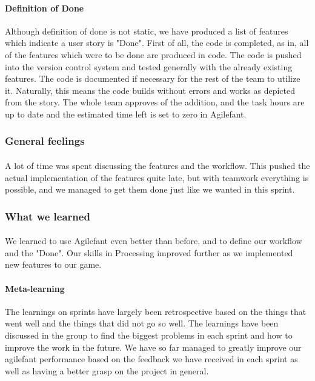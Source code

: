 \paragraph{Definition of Done} Although definition of done is not static, we have produced a list of features which indicate a user story is "Done". First of all, the code is completed, as in, all of the features which were to be done are produced in code. The code is pushed into the version control system and tested generally with the already existing features. The code is documented if necessary for the rest of the team to utilize it. Naturally, this means the code builds without errors and works as depicted from the story. The whole team approves of the addition, and the task hours are up to date and the estimated time left is set to zero in Agilefant.


\subsubsection{General feelings}

\paragraph{} A lot of time was spent discussing the features and the workflow. This pushed the actual implementation of the features quite late, but with teamwork everything is possible, and we managed to get them done just like we wanted in this sprint.

\subsubsection{What we learned}

\paragraph{} We learned to use Agilefant even better than before, and to define our workflow and the "Done". Our skills in Processing improved further as we implemented new features to our game.

\paragraph{Meta-learning} The learnings on sprints have largely been retrospective based on the things that went well and the things that did not go so well. The learnings have been discussed in the group to find the biggest problems in each sprint and how to improve the work in the future. We have so far managed to greatly improve our agilefant performance based on the feedback we have received in each sprint as well as having a better grasp on the project in general.

